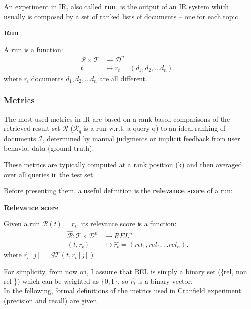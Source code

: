 An experiment in IR, also called \textbf{run}, is the output of an IR system which usually is composed by a set of ranked lists of documents – one for each topic.

\begin{definition}{\textbf{Run}}

A run is a function:
\begin{align*}
  \mathcal{R} \times \mathcal{T} &\to \mathcal{D}^n\\
  t &\mapsto r_t = (d_1, d_2, \dots d_n).
\end{align*}
where $r_t$ documents $d_1, d_2, \dots d_n$ are all different.

\end{definition}

\subsubsection{Metrics}
\label{ssec:metrics}

The most used metrics in IR are based on a rank-based comparisons of the
retrieved result set $\mathcal{R}$ ($\mathcal{R}_q$ is a run w.r.t. a query q) to an ideal ranking of documents $\mathcal{I}$, determined by manual judgments or implicit feedback from user behavior data (ground truth).

These metrics are typically computed at a rank position (k) and then
averaged over all queries in the test set.

Before presenting them, a useful definition is the \textbf{relevance score} of a run:

\begin{definition}{\textbf{Relevance score}}

Given a run $\mathcal{R}(t) = r_t$, its relevance score is a function:
\begin{align*}
  \mathcal{\hat{R}} \colon \mathcal{T} \times \mathcal{D}^n &\to REL^n\\
  (t, r_t) &\mapsto \hat{r_t} = (rel_1, rel_2, \dots rel_n).
\end{align*}
where $\hat{r_t}[j] = \mathcal{GT}(t, r_t[j])$
\end{definition}

For simplicity, from now on, I assume that REL is simply a binary set (\{rel, non rel \}) which can be weighted as $\{0, 1\}$, so $\hat{r_t}$ is a binary vector. \\

In the following, formal definitions of the metrics used in Cranfield experiment (precision and recall) are given.

